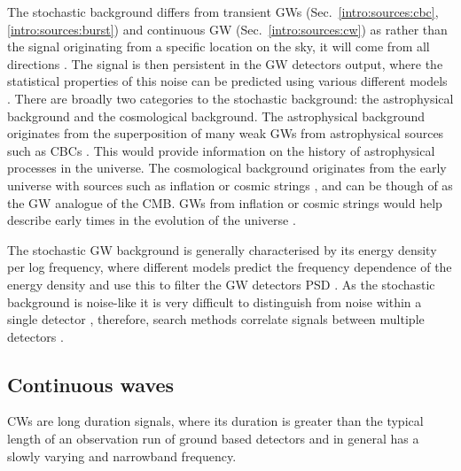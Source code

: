 The stochastic background differs from transient \glspl{GW} (Sec.~\ref{intro:sources:cbc}, \ref{intro:sources:burst}) and continuous \gls{GW} (Sec.~\ref{intro:sources:cw}) as rather than the signal originating from a specific location on the sky, it will come from all directions \citep{christensen2018StochasticGravitational}. 
The signal is then persistent in the \gls{GW} detectors output, where the statistical properties of this noise can be predicted using various different models \citep{christensen2018StochasticGravitational}.   
There are broadly two categories to the stochastic background: the astrophysical background and the cosmological background. 
The astrophysical background originates from the superposition of many weak \glspl{GW} from astrophysical sources such as \glspl{CBC} \citep{regimbau2011AstrophysicalGravitational}. 
This would provide information on the history of astrophysical processes in the universe.
The cosmological background originates from the early universe with sources such as inflation or cosmic strings \citep{maggiore2000GravitationalWave}, and can be though of as the \gls{GW} analogue of the \gls{CMB}.
\glspl{GW} from inflation or cosmic strings would help describe early times in the evolution of the universe \citep{christensen2018StochasticGravitational}.

The stochastic \gls{GW} background is generally characterised by its energy density per log frequency, where different models predict the frequency dependence of the energy density and use this to filter the \gls{GW} detectors \gls{PSD} \citep{allen1999DetectingStochastic}.
As the stochastic background is noise-like it is very difficult to distinguish from noise within a single detector \citep{christensen2018StochasticGravitational}, therefore, search methods correlate signals between multiple detectors
\citep{romano2019SearchesStochastic,christensen2018StochasticGravitational,allen1999DetectingStochastic}.


\subsection{\label{intro:sources:cw}Continuous waves}

\glspl{CW} are long duration signals, where its duration is greater than
the typical length of an observation run of ground based detectors and in general has a slowly varying and narrowband frequency. 

